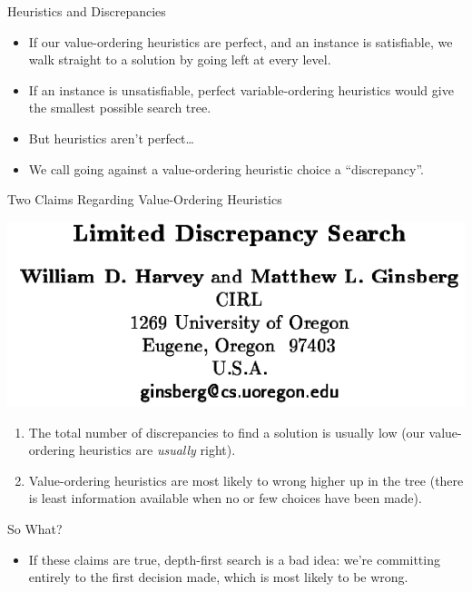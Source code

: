 \documentclass{beamer}
\begin{document}
\begin{frame}{Heuristics and Discrepancies}

    \begin{itemize}
        \item If our value-ordering heuristics are perfect, and an instance is satisfiable, we walk
            straight to a solution by going left at every level.
        \item If an instance is unsatisfiable, perfect variable-ordering heuristics would give the
            smallest possible search tree.
        \item But heuristics aren't perfect\ldots
        \item We call going against a value-ordering heuristic choice a ``discrepancy''.
    \end{itemize}

\end{frame}

\begin{frame}{Two Claims Regarding Value-Ordering Heuristics}

    \centering
    \includegraphics*[keepaspectratio=true,scale=0.3]{lds-paper.png}
    \vspace{1em}

    \begin{enumerate}
        \item The total number of discrepancies to find a solution is usually low (our
            value-ordering heuristics are \emph{usually} right).
        \item Value-ordering heuristics are most likely to wrong higher up in the tree (there is
            least information available when no or few choices have been made).
    \end{enumerate}

\end{frame}

\begin{frame}{So What?}

    \begin{itemize}
        \item If these claims are true, depth-first search is a bad idea: we're committing entirely
            to the first decision made, which is most likely to be wrong.
    \end{itemize}

\end{frame}
\end{document}

